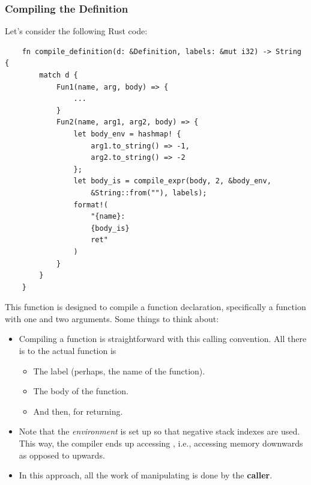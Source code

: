 \subsubsection{Compiling the Definition}
Let's consider the following Rust code: 
\begin{verbatim}
    fn compile_definition(d: &Definition, labels: &mut i32) -> String {
        match d {
            Fun1(name, arg, body) => {
                ...
            }
            Fun2(name, arg1, arg2, body) => {
                let body_env = hashmap! {
                    arg1.to_string() => -1,
                    arg2.to_string() => -2
                };
                let body_is = compile_expr(body, 2, &body_env, 
                    &String::from(""), labels);
                format!(
                    "{name}:
                    {body_is}
                    ret"
                )
            }
        }
    }\end{verbatim}
This function is designed to compile a function declaration, specifically a function with one and two arguments. Some things to think about: 
\begin{itemize}
    \item Compiling a function is straightforward with this calling convention. All there is to the actual function is 
    \begin{itemize}
        \item The label (perhaps, the name of the function).
        \item The body of the function. 
        \item And then,  for returning.
    \end{itemize}
    \item Note that the \emph{environment} is set up so that negative stack indexes are used. This way, the compiler ends up accessing \code{[rsp + X]}, i.e., accessing memory downwards as opposed to upwards. 
    \item In this approach, all the work of manipulating  is done by the \textbf{caller}.
\end{itemize}

